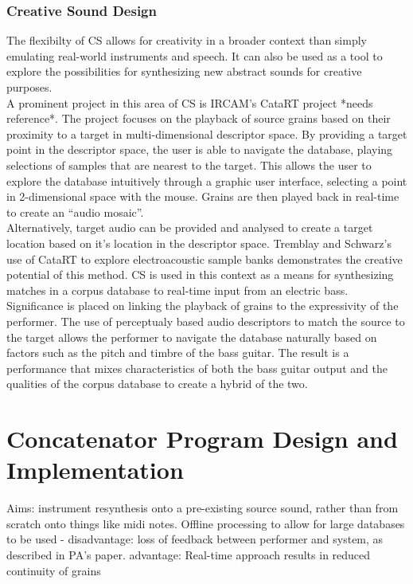 \documentclass{scrartcl}
\begin{document}
    \subsubsection*{Creative Sound Design}
    The flexibilty of CS allows for creativity in a broader context than simply
    emulating real-world instruments and speech. It can also be used as a tool
    to explore the possibilities for synthesizing new abstract sounds for
    creative purposes.\\
    A prominent project in this area of CS is IRCAM's CataRT project *needs
    reference*. The project focuses on the playback of source grains based on
    their proximity to a target in multi-dimensional descriptor space. 
    By providing a target point in the descriptor space, the user is able to
    navigate the database, playing selections of samples that are nearest to
    the target. This allows the user to explore the database intuitively
    through a graphic user interface, selecting a point in 2-dimensional space
    with the mouse. Grains are then played back in real-time to create an
    ``audio mosaic''.\\
    Alternatively, target audio can be provided and analysed to create a target
    location based on it's location in the descriptor space.  Tremblay and
    Schwarz's~\citeyearpar{Tremblay2010} use of CataRT to explore
    electroacoustic sample banks demonstrates the creative potential of this
    method. CS is used in this context as a means for synthesizing matches in a
    corpus database to real-time input from an electric bass.  Significance is
    placed on linking the playback of grains to the expressivity of the
    performer. The use of perceptualy based audio descriptors to match the
    source to the target allows the performer to navigate the database
    naturally based on factors such as the pitch and timbre of the bass
    guitar. The result is a performance that mixes characteristics of both the
    bass guitar output and the qualities of the corpus database to create a
    hybrid of the two.
    
    \section*{Concatenator Program Design and Implementation}
    Aims:
    instrument resynthesis onto a pre-existing source sound, rather than from scratch onto things like midi notes.
    Offline processing to allow for large databases to be used - disadvantage: loss of feedback between performer and system, as described in PA's paper.
    advantage: Real-time approach results in reduced continuity of grains
\end{document}
